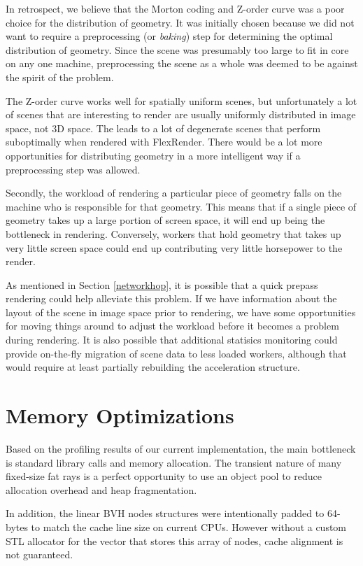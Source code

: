 \documentclass[12pt]{ucthesis}
\begin{document}
In retrospect, we believe that the Morton coding and Z-order curve was
a poor choice for the distribution of geometry. It was initially chosen because
we did not want to require a preprocessing (or \emph{baking}) step for
determining the optimal distribution of geometry. Since the scene was presumably
too large to fit in core on any one machine, preprocessing the scene as a whole
was deemed to be against the spirit of the problem.

The Z-order curve works well for spatially uniform scenes, but unfortunately a
lot of scenes that are interesting to render are usually uniformly distributed
in image space, not 3D space. The leads to a lot of degenerate scenes that
perform suboptimally when rendered with FlexRender. There would be a lot more
opportunities for distributing geometry in a more intelligent way if a
preprocessing step was allowed.

Secondly, the workload of rendering a particular piece of geometry falls on
the machine who is responsible for that geometry. This means that if a single
piece of geometry takes up a large portion of screen space, it will end up
being the bottleneck in rendering. Conversely, workers that hold geometry that
takes up very little screen space could end up contributing very little
horsepower to the render.

As mentioned in Section \ref{networkhop}, it is possible that a quick prepass
rendering could help alleviate this problem. If we have information about the
layout of the scene in image space prior to rendering, we have some opportunities
for moving things around to adjust the workload before it becomes a problem during
rendering. It is also possible that additional statisics monitoring could provide
on-the-fly migration of scene data to less loaded workers, although that would
require at least partially rebuilding the acceleration structure.

\section{Memory Optimizations}
\label{memory}

Based on the profiling results of our current implementation, the main
bottleneck is standard library calls and memory allocation. The transient
nature of many fixed-size fat rays is a perfect opportunity to use an object
pool to reduce allocation overhead and heap fragmentation.

In addition, the linear BVH nodes structures were intentionally padded to
64-bytes to match the cache line size on current CPUs. However without a custom
STL allocator for the vector that stores this array of nodes, cache alignment
is not guaranteed.
\end{document}
